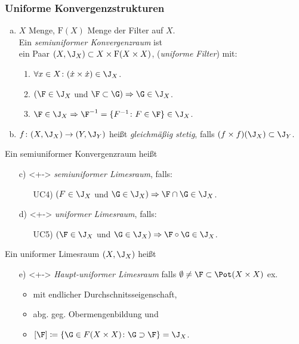 \begin{frame}
  \frametitle{Uniforme Konvergenzstrukturen}
  \begin{enumerate}[a)]
    \item<+-> $X$ Menge, $\mathrm{F}(X)$ Menge der Filter auf $X$.\\
      Ein \emph{semiuniformer Konvergenzraum} ist \\
      ein Paar $(X, \J_X) \subset X \times \mathrm{F}(X \times X)$, (\emph{uniforme Filter}) mit: 
      \begin{enumerate}[UC1)]
         \item $\forall x \in X \colon (\dot x \times \dot x) \in \J_X$.
         \item $(\F \in \J_X$ und $\F \subset \G) \Rightarrow \G \in \J_X$.
         \item $\F \in \J_X \Rightarrow \F^{-1} = \{F^{-1} \colon F \in \F\} \in \J_X$.
      \end{enumerate}
    \item<+-> $f \colon (X, \J_X) \to (Y, \J_Y)$ heißt \emph{gleichmäßig stetig}, falls $(f \times f)(\J_X) \subset \J_Y$.
  \end{enumerate}
  \pause
  Ein semiuniformer Konvergenzraum heißt 
\begin{enumerate}[a)]
  \item[c)]<+-> \emph{semiuniformer Limesraum}, falls:
    \begin{enumerate}[UC1)]
      \item[UC4)] $(F \in \J_X$ und $\G \in \J_X) \Rightarrow \F \cap \G \in \J_X$.
    \end{enumerate}
  \item[d)]<+-> \emph{uniformer Limesraum}, falls:
    \begin{enumerate}[UC1)]
      \item[UC5)] $(\F \in \J_X$ und $\G \in \J_X) \Rightarrow \F \circ \G \in \J_X$.
    \end{enumerate}
  \end{enumerate}
  \pause
  Ein uniformer Limesraum $(X, \J_X)$ heißt
  \begin{enumerate}[a)]
    \item[e)]<+-> \emph{Haupt-uniformer Limesraum} falls $\emptyset \neq \F \subset \Pot(X \times X)$ ex.
      \begin{itemize}
        \item  mit endlicher Durchschnitsseigenschaft, 
        \item abg. geg. Obermengenbildung und 
        \item $[\F] \coloneqq \{\G \in F(X\times X) \colon \G \supset \F \}= \J_X$.
      \end{itemize}
  \end{enumerate}
\end{frame}

